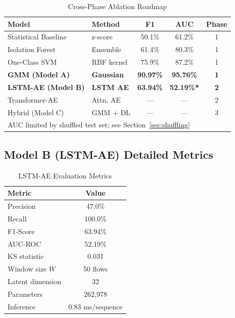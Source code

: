 \documentclass[conference]{IEEEtran}
\begin{document}
\begin{table}[htbp]
  \caption{Cross-Phase Ablation Roadmap}
  \label{tab:ablation_all}
  \centering
  \begin{tabular}{@{}llccc@{}}
    \toprule
    Model & Method & F1 & AUC & Phase \\
    \midrule
    Statistical Baseline & z-score      & 50.1\% & 61.2\% & 1 \\
    Isolation Forest     & Ensemble     & 61.4\% & 80.3\% & 1 \\
    One-Class SVM        & RBF kernel   & 75.9\% & 87.2\% & 1 \\
    \textbf{GMM (Model A)} & \textbf{Gaussian} & \textbf{90.97\%} & \textbf{95.76\%} & \textbf{1} \\
    \midrule
    \textbf{LSTM-AE (Model B)} & \textbf{LSTM AE} & \textbf{63.94\%} & \textbf{52.19\%*} & \textbf{2} \\
    Transformer-AE       & Attn. AE     & ---    & ---    & 2 \\
    \midrule
    Hybrid (Model C)     & GMM + DL     & ---    & ---    & 3 \\
    \bottomrule
    \multicolumn{5}{l}{\small * AUC limited by shuffled test set; see Section~\ref{sec:shuffling}}
  \end{tabular}
\end{table}

\subsection{Model B (LSTM-AE) Detailed Metrics}

\begin{table}[htbp]
  \caption{LSTM-AE Evaluation Metrics}
  \label{tab:lstm_metrics}
  \centering
  \begin{tabular}{@{}lc@{}}
    \toprule
    Metric & Value \\
    \midrule
    Precision & 47.0\% \\
    Recall    & 100.0\% \\
    F1-Score  & 63.94\% \\
    AUC-ROC   & 52.19\% \\
    KS statistic & 0.031 \\
    \midrule
    Window size $W$ & 50 flows \\
    Latent dimension & 32 \\
    Parameters & 262,978 \\
    Inference & 0.83 ms/sequence \\
    \bottomrule
  \end{tabular}
\end{table}
\end{document}
